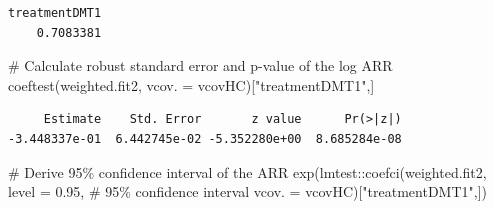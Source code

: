 \documentclass[
  letterpaper,
  DIV=11,
  numbers=noendperiod]{scrreprt}
\newenvironment{Shaded}{\begin{snugshade}}{\end{snugshade}}
\newcommand{\AttributeTok}[1]{\textcolor[rgb]{0.40,0.45,0.13}{#1}}
\newcommand{\CommentTok}[1]{\textcolor[rgb]{0.37,0.37,0.37}{#1}}
\newcommand{\FloatTok}[1]{\textcolor[rgb]{0.68,0.00,0.00}{#1}}
\newcommand{\FunctionTok}[1]{\textcolor[rgb]{0.28,0.35,0.67}{#1}}
\newcommand{\NormalTok}[1]{\textcolor[rgb]{0.00,0.23,0.31}{#1}}
\newcommand{\OtherTok}[1]{\textcolor[rgb]{0.00,0.23,0.31}{#1}}
\newcommand{\SpecialCharTok}[1]{\textcolor[rgb]{0.37,0.37,0.37}{#1}}
\newcommand{\StringTok}[1]{\textcolor[rgb]{0.13,0.47,0.30}{#1}}
\begin{document}
\begin{Shaded}
\end{Shaded}

\begin{verbatim}
treatmentDMT1 
    0.7083381 
\end{verbatim}

\begin{Shaded}
\begin{Highlighting}[]
\CommentTok{\# Calculate robust standard error and p{-}value of the log ARR}
\FunctionTok{coeftest}\NormalTok{(weighted.fit2, }\AttributeTok{vcov. =}\NormalTok{ vcovHC)[}\StringTok{"treatmentDMT1"}\NormalTok{,]}
\end{Highlighting}
\end{Shaded}

\begin{verbatim}
     Estimate    Std. Error       z value      Pr(>|z|) 
-3.448337e-01  6.442745e-02 -5.352280e+00  8.685284e-08 
\end{verbatim}

\begin{Shaded}
\begin{Highlighting}[]
\CommentTok{\# Derive 95\% confidence interval of the ARR}
\FunctionTok{exp}\NormalTok{(lmtest}\SpecialCharTok{::}\FunctionTok{coefci}\NormalTok{(weighted.fit2, }
       \AttributeTok{level =} \FloatTok{0.95}\NormalTok{, }\CommentTok{\# 95\% confidence interval}
       \AttributeTok{vcov. =}\NormalTok{ vcovHC)[}\StringTok{"treatmentDMT1"}\NormalTok{,])}
\end{Highlighting}
\end{Shaded}
\end{document}
